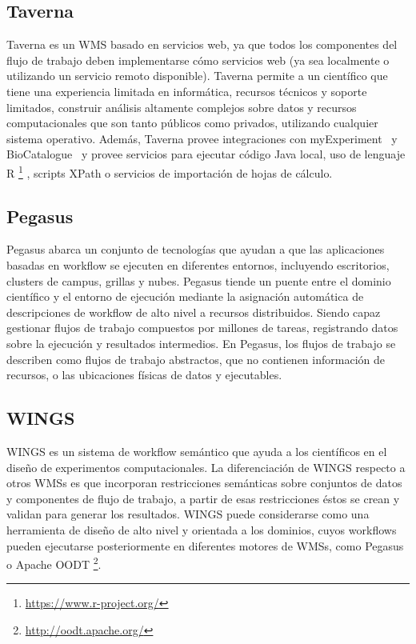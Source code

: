 \subsection{Taverna}	
Taverna \cite{DBLP:journals/bioinformatics/OinnAFMSGCGPWL04} es un WMS basado en servicios web, ya que todos los componentes del flujo de trabajo deben implementarse cómo servicios web (ya sea localmente o utilizando un servicio remoto disponible). 
Taverna permite a un científico que tiene una experiencia limitada en informática, recursos técnicos y soporte limitados, construir análisis altamente complejos sobre datos y recursos computacionales que son tanto públicos como privados, utilizando cualquier sistema operativo.
Además, Taverna provee integraciones con myExperiment~\cite{goble2010myexperiment} y BioCatalogue~\cite{bhagat2010biocatalogue} y provee servicios para ejecutar código Java local, uso de lenguaje R \footnote{\url{https://www.r-project.org/}} , scripts XPath o servicios de importación de hojas de cálculo.

\subsection{Pegasus}
Pegasus\cite{deelman2004pegasus} abarca un conjunto de tecnologías que ayudan a que las aplicaciones basadas en workflow se ejecuten en diferentes entornos, incluyendo escritorios, clusters de campus, grillas y nubes. Pegasus tiende un puente entre el dominio científico y el entorno de ejecución mediante la asignación automática de descripciones de workflow de alto nivel a recursos distribuidos. 
Siendo capaz gestionar flujos de trabajo compuestos por millones de tareas, registrando datos sobre la ejecución y resultados intermedios.
En Pegasus, los flujos de trabajo se describen como flujos de trabajo abstractos, que no contienen información de recursos, o las ubicaciones físicas de datos y ejecutables.

\subsection{WINGS}  
 
WINGS \cite{DBLP:journals/expert/GilRKGGMD11} es un sistema de workflow semántico que ayuda a los científicos en el diseño de experimentos computacionales.
La diferenciación de WINGS respecto a otros WMSs es que incorporan restricciones semánticas sobre conjuntos de datos y componentes de flujo de trabajo, a partir de esas restricciones éstos se crean y validan para generar los resultados.  
WINGS puede considerarse como una herramienta de diseño de alto nivel y orientada a los dominios, cuyos workflows pueden ejecutarse posteriormente en diferentes motores de WMSs, como Pegasus~\cite{deelman2004pegasus} o Apache OODT \footnote{\url{http://oodt.apache.org/}}.

